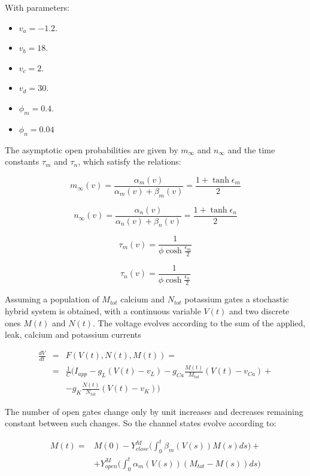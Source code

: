 	With parameters:

	\begin{multicols}{3}
		\begin{itemize}
			\item $v_a = -1.2$.
			\item $v_b = 18$.
			\item $v_c = 2$.
			\item $v_d = 30$.
			\item $\phi_m = 0.4$.
			\item $\phi_n = 0.04$
		\end{itemize}
	\end{multicols}

	The asymptotic open probabilities are given by $m_\infty$ and $n_\infty$ and the time constants $\tau_m$ and $\tau_n$, which satisfy the relations:

	$$m_\infty(v) = \frac{\alpha_m(v)}{\alpha_m(v) + \beta_m(v)} = \frac{1+\tanh\epsilon_m}{2}$$

	$$n_\infty(v) = \frac{\alpha_n(v)}{\alpha_n(v) + \beta_n(v)} = \frac{1+\tanh\epsilon_n}{2}$$

	$$\tau_m(v) = \frac{1}{\phi\cosh\frac{\epsilon_m}{2}}$$

	$$\tau_n(v) = \frac{1}{\phi\cosh\frac{\epsilon_n}{2}}$$

	Assuming a population of $M_{tot}$ calcium and $N_{tot}$ potassium gates a stochastic hybrid system is obtained, with a continuous variable $V(t)$ and two discrete ones $M(t)$ and $N(t)$.
	The voltage evolves according to the sum of the applied, leak, calcium and potassium currents

	\begin{align*}
		\frac{dV}{dt} &=&  F(V(t), N(t), M(t)) = \\
									&=& \frac{1}{C}\biggl(I_{app} - g_L(V(t)-v_L)-g_{Ca}\frac{M(t)}{M_{tot}}(V(t)-v_{Ca}) +\\
									& &- g_K\frac{N(t)}{N_{tot}}(V(t)-v_K)\biggr)
	\end{align*}

	The number of open gates change only by unit increases and decreases remaining constant between such changes.
	So the channel states evolve according to:

	\begin{align*}
		M(t) =&M(0) - Y_{close}^M\biggl(\int_0^t\beta_m(V(s))M(s)ds\biggr)+\\
					&+Y_{open}^M\biggl(\int_0^t\alpha_m(V(s))(M_{tot}-M(s))ds\biggr)
	\end{align*}

